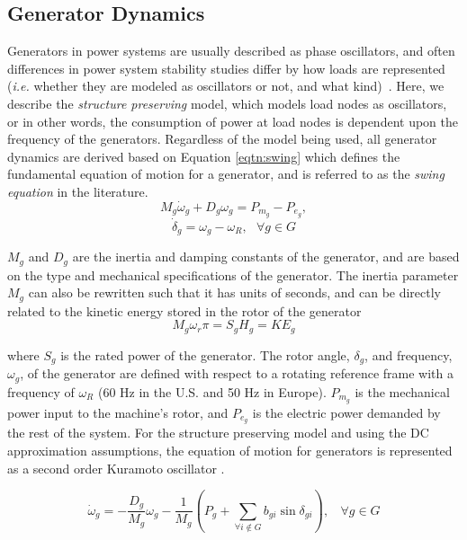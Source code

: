 \subsection{Generator Dynamics}
\label{sec:gen_dyn}

Generators in power systems are usually described as phase oscillators, and often differences in power system stability studies differ by how loads are represented (\textit{i.e.} whether they are modeled as oscillators or not, and what kind)~\cite{Takashi2015}.  Here, we describe the \textit{structure preserving} model, which models load nodes as oscillators, or in other words, the consumption of power at load nodes is dependent upon the frequency of the generators.  Regardless of the model being used, all generator dynamics are derived based on Equation \ref{eqtn:swing} which defines the fundamental equation of motion for a generator, and is referred to as the \textit{swing equation} in the literature.
\begin{equation}
\label{eqtn:swing}
M_g\dot{\omega}_g + D_g\omega_g= P_{m_g} - P_{e_g},
\end{equation}
\begin{equation*}
\dot{\delta}_g = \omega_g -\omega_R, \ \ \ \forall g \in G
\end{equation*}


$M_g$ and $D_g$ are the inertia and damping constants of the generator, and are based on the type and mechanical specifications of the generator.  The inertia parameter $M_g$ can also be rewritten such that it has units of seconds, and can be directly related to the kinetic energy stored in the rotor of the generator
\begin{equation}
M_g \omega_r\pi = S_gH_g = KE_g
\label{eqtn:inertia}	
\end{equation}

where $S_g$ is the rated power of the generator.
The rotor angle, $\delta_g$, and frequency, $\omega_g$, of the generator are defined with respect to a rotating reference frame with a frequency of $\omega_R$ (60 Hz in the U.S. and 50 Hz in Europe). $P_{m_g}$ is the mechanical power input to the machine's rotor, and $P_{e_g}$ is the electric power demanded by the rest of the system.  For the structure preserving model and using the DC approximation assumptions, the equation of motion for generators is represented as a second order Kuramoto oscillator \cite{Dorfler}.


\begin{equation}
\label{eqtn:sp_gen}
	\dot{\omega}_g = -\frac{D_g}{M_g}\omega_g-\frac{1}{M_g}(P_g + \sum_{\forall i \notin G} b_{gi}\sin\delta_{gi}),\ \ \ \ \forall g \in G
\end{equation}

